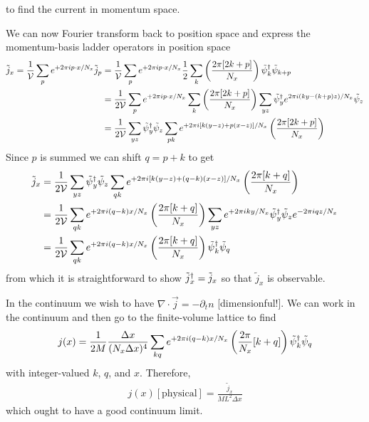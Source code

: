to find the current in momentum space.

We can now Fourier transform back to position space and express the momentum-basis ladder operators in position space
\begin{align}
	\tilde{j}_x
	=
	\frac{1}{\mathcal{V}} \sum_p e^{+2\pi i p \cdot x / N_x} \tilde{j}_p 
	&=
	\frac{1}{\mathcal{V}} \sum_p e^{+2\pi i p \cdot x / N_x} 
	\frac{1}{2} \sum_k \left(\frac{2\pi [ 2k+p ]}{N_x}\right) \tilde{\psi}{}^{\dagger}_{k} \tilde{\psi}_{k+p}
	\nonumber\\
	&=
	\frac{1}{2\mathcal{V}} \sum_p e^{+2\pi i p \cdot x / N_x} 
	\sum_k \left(\frac{2\pi [ 2k+p ]}{N_x}\right) \sum_{yz} \tilde{\psi}{}^{\dagger}_{y} e^{2\pi i (ky - (k+p)z) / N_x} \tilde{\psi}_{z}
	\nonumber\\
	&=
	\frac{1}{2\mathcal{V}}
	\sum_{yz} \tilde{\psi}{}^{\dagger}_{y}  \tilde{\psi}_{z}
	\sum_{pk} e^{+2\pi i [ k (y-z) + p  (x-z) ]  / N_x} \left(\frac{2\pi [ 2k+p ]}{N_x}\right)
\end{align}
Since $p$ is summed we can shift $q=p+k$ to get
\begin{align}
	\tilde{j}_x
	&=
	\frac{1}{2\mathcal{V}}
	\sum_{yz} \tilde{\psi}{}^{\dagger}_{y}  \tilde{\psi}_{z}
	\sum_{qk} e^{+2\pi i [ k (y-z) + (q-k)  (x-z) ]  / N_x} \left(\frac{2\pi [ k+q ]}{N_x}\right)
	\nonumber\\
	&=
	\frac{1}{2\mathcal{V}}
	\sum_{qk} e^{+2\pi i (q-k) x / N_x} \left(\frac{2\pi [ k+q ]}{N_x}\right)
	\sum_{yz} e^{+2\pi i ky / N_x} \tilde{\psi}{}^{\dagger}_{y} \tilde{\psi}_{z} e^{-2\pi i q z / N_x}
	\\
	&=
	\frac{1}{2\mathcal{V}}
	\sum_{qk} e^{+2\pi i (q-k) x / N_x} \left(\frac{2\pi [ k+q ]}{N_x}\right)
	\tilde{\psi}{}^{\dagger}_{k} \tilde{\psi}_{q}
	\label{eq:current hermitian}
\end{align}
from which it is straightforward to show $\tilde{j}{}^{\dagger}_x = \tilde{j}_x$ so that $\tilde{j}_x$ is observable.

In the continuum we wish to have $\nabla\cdot\vec{j} = - \partial_t n$ [dimensionful!].
We can work in the continuum and then go to the finite-volume lattice to find
\begin{align}
	j(x) = \frac{1}{2M} \frac{\Delta x}{(N_x \Delta x)^4} \sum_{kq} e^{+2\pi i(q-k) x / N_x} \left(\frac{2\pi}{N_x}[ k+q ]\right) \tilde{\psi}{}^{\dagger}_k \tilde{\psi}_q
\end{align}
with integer-valued $k$, $q$, and $x$.
Therefore, 
\begin{align}
	j(x) [\text{physical}] = \frac{\tilde{j}_x}{ML^2 \Delta x}
\end{align}
which ought to have a good continuum limit.

